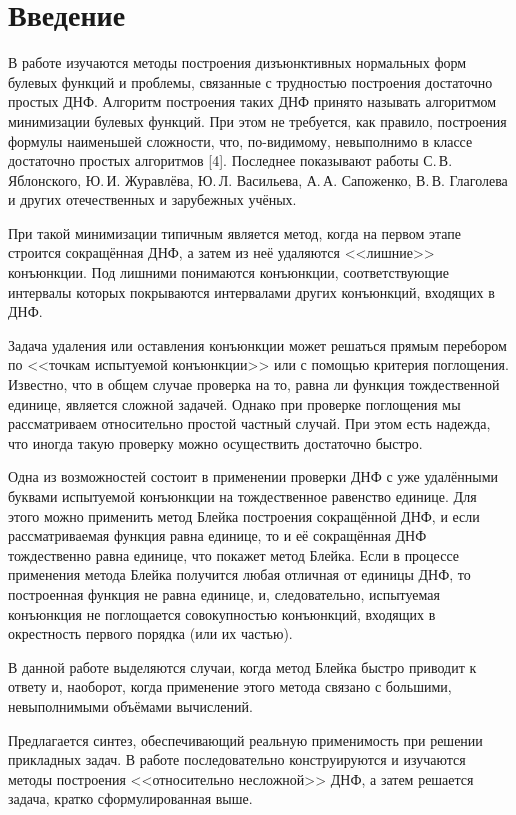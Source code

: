 \documentclass[12pt,a4paper,oneside,fleqn,leqno]{article}
\theoremstyle{definition}
\begin{document}
\section*{Введение}
	В работе изучаются методы построения дизъюнктивных нормальных форм булевых функций и проблемы, связанные с трудностью построения достаточно простых ДНФ. Алгоритм построения таких ДНФ принято называть алгоритмом минимизации булевых функций. При этом не требуется, как правило, построения формулы наименьшей сложности, что, по-видимому, невыполнимо в классе достаточно простых алгоритмов [4]. Последнее показывают работы С.\,В. Яблонского, Ю.\,И. Журавлёва, Ю.\,Л. Васильева, А.\,А. Сапоженко, В.\,В. Глаголева и других отечественных и зарубежных учёных.\par
	При такой минимизации типичным является метод, когда на первом этапе строится сокращённая ДНФ, а затем из неё удаляются <<лишние>> конъюнкции. Под лишними понимаются конъюнкции, соответствующие интервалы которых покрываются интервалами других конъюнкций, входящих в ДНФ.\par
	Задача удаления или оставления конъюнкции может решаться прямым перебором по <<точкам испытуемой конъюнкции>> или с помощью критерия поглощения. Известно, что в общем случае проверка на то, равна ли функция тождественной единице, является сложной задачей. Однако при проверке поглощения мы рассматриваем относительно простой частный случай. При этом есть надежда, что иногда такую проверку можно осуществить достаточно быстро.\par
	Одна из возможностей состоит в применении проверки ДНФ с уже удалёнными буквами испытуемой конъюнкции на тождественное равенство единице. Для этого можно применить метод Блейка построения сокращённой ДНФ, и если рассматриваемая функция равна единице, то и её сокращённая ДНФ тождественно равна единице, что покажет метод Блейка. Если в процессе применения метода Блейка получится любая отличная от единицы ДНФ, то построенная функция не равна единице, и, следовательно, испытуемая конъюнкция не поглощается совокупностью конъюнкций, входящих в окрестность первого порядка (или их частью).\par
	В данной работе выделяются случаи, когда метод Блейка быстро приводит к ответу и, наоборот, когда применение этого метода связано с большими, невыполнимыми объёмами вычислений.\par
	Предлагается синтез, обеспечивающий реальную применимость при решении прикладных задач. В работе последовательно конструируются и изучаются методы построения <<относительно несложной>> ДНФ, а затем решается задача, кратко сформулированная выше.\par
\end{document}
